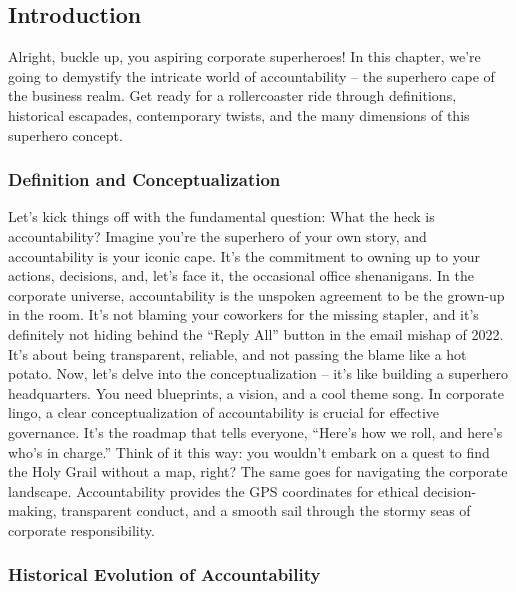 \documentclass[
  letterpaper,
  DIV=11,
  numbers=noendperiod]{scrreprt}
\begin{document}
\subsection{Introduction}\label{introduction-2}

Alright, buckle up, you aspiring corporate superheroes! In this chapter,
we're going to demystify the intricate world of accountability -- the
superhero cape of the business realm. Get ready for a rollercoaster ride
through definitions, historical escapades, contemporary twists, and the
many dimensions of this superhero concept.

\subsubsection{Definition and
Conceptualization}\label{definition-and-conceptualization}

Let's kick things off with the fundamental question: What the heck is
accountability? Imagine you're the superhero of your own story, and
accountability is your iconic cape. It's the commitment to owning up to
your actions, decisions, and, let's face it, the occasional office
shenanigans. In the corporate universe, accountability is the unspoken
agreement to be the grown-up in the room. It's not blaming your
coworkers for the missing stapler, and it's definitely not hiding behind
the ``Reply All'' button in the email mishap of 2022. It's about being
transparent, reliable, and not passing the blame like a hot potato. Now,
let's delve into the conceptualization -- it's like building a superhero
headquarters. You need blueprints, a vision, and a cool theme song. In
corporate lingo, a clear conceptualization of accountability is crucial
for effective governance. It's the roadmap that tells everyone, ``Here's
how we roll, and here's who's in charge.'' Think of it this way: you
wouldn't embark on a quest to find the Holy Grail without a map, right?
The same goes for navigating the corporate landscape. Accountability
provides the GPS coordinates for ethical decision-making, transparent
conduct, and a smooth sail through the stormy seas of corporate
responsibility.

\subsubsection{Historical Evolution of
Accountability}\label{historical-evolution-of-accountability}
\end{document}
